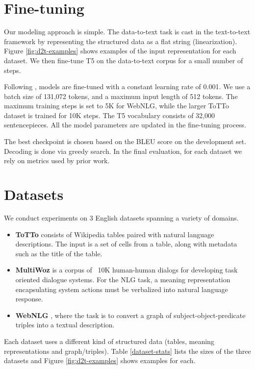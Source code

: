 \documentclass[11pt,a4paper]{article}
\begin{document}
\section{Fine-tuning}
Our modeling approach is simple. The data-to-text task is cast in the text-to-text framework by representing the structured data as a flat string (linearization). Figure \ref{fig:d2t-examples} shows examples of the input representation for each dataset. 
We then fine-tune T5 on the data-to-text corpus for a small number of steps. 
\par  Following  \cite{raffel2019exploring}, models are fine-tuned with a constant learning rate of 0.001. We use a batch size of 131,072 tokens, and a maximum input length of 512 tokens. The maximum training steps is set to 5K for  WebNLG, while the larger ToTTo dataset is trained for 10K steps. The T5 vocabulary consists of 32,000 sentencepieces. All the model parameters are updated in the fine-tuning process.

\par The best checkpoint is chosen based on the BLEU \cite{papineni2002bleu} score on the development set. Decoding is done via greedy search. In the final evaluation, for each dataset we rely on metrics used by prior work.



\section{Datasets}
We conduct experiments on 3 English datasets spanning a variety of domains.
\begin{itemize}
   \item \textbf{ToTTo} \cite{parikh2020totto} consists of Wikipedia tables paired with natural language descriptions. The input is a set of cells from  a table, along with metadata such as the title of the table.
   \item \textbf{MultiWoz} \cite{budzianowski2018multiwoz} is a corpus of ~10K human-human dialogs for developing task oriented dialogue systems. For the NLG task, a meaning representation encapsulating system actions must be verbalized into natural language response. \item \textbf{WebNLG} \cite{gardent2017webnlg}, where the task is to convert a graph of subject-object-predicate triples into a textual description.
\end{itemize}
\par Each dataset uses a different kind of structured data (tables, meaning representations and graph/triples).
Table \ref{dataset-stats} lists the sizes of the three datasets and Figure \ref{fig:d2t-examples} shows examples for each.
\end{document}
